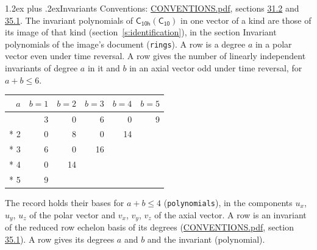 \documentclass[10pt,a4paper]{article}
\makeatletter
\renewcommand\section{\@startsection{section}{1}{\z@}{-3ex plus -1ex minus -.2ex}%
  {1.2ex plus .2ex}{\normalfont\large\sffamily\bfseries\color{parttitle}}}
\numberwithin{equation}{section}
\newcommand{\grp}[1]{\mathsf{#1}}
\makeatother
\begin{document}
\section{Invariants}\label{s:invariants}
Conventions: \href{../../CONVENTIONS.pdf}{CONVENTIONS.pdf}, sections \href{../../CONVENTIONS.pdf\#conv.31.2}{31.2} and \href{../../CONVENTIONS.pdf\#conv.35.1}{35.1}.
The invariant polynomials of $\grp{C_{10h}}(\grp{C_{10}})$ in one vector of a kind are those of its image of that kind (section~\ref{s:identification}), in the section Invariant polynomials of the image's document (\texttt{rings}).
\leavevmode\label{n:index.degree.polar}\label{n:index.degree.axial}A row is a degree $a$ in a polar vector even under time reversal. A row gives the number of linearly independent invariants of degree $a$ in it and $b$ in an axial vector odd under time reversal, for $a + b \le 6$.
{\small\begin{longtable}{@{}rrrrrr@{}}\toprule
$a$ & $b = 1$ & $b = 2$ & $b = 3$ & $b = 4$ & $b = 5$\\\midrule\endhead
\bottomrule\endfoot\endlastfoot
1 & 3 & 0 & 6 & 0 & 9\\*
2 & 0 & 8 & 0 & 14 & \\*
3 & 6 & 0 & 16 &  & \\*
4 & 0 & 14 &  &  & \\*
5 & 9 &  &  &  & \\
\bottomrule\end{longtable}}
\leavevmode\label{n:local.component.polar}\label{n:local.component.axial}The record holds their bases for $a + b \le 4$ (\texttt{polynomials}), in the components $u_{x}$, $u_{y}$, $u_{z}$ of the polar vector and $v_{x}$, $v_{y}$, $v_{z}$ of the axial vector. \label{n:head.polynomial}A row is an invariant of the reduced row echelon basis of its degrees (\href{../../CONVENTIONS.pdf}{CONVENTIONS.pdf}, section \href{../../CONVENTIONS.pdf\#conv.35.1}{35.1}). A row gives its degrees $a$ and $b$ and the invariant (polynomial).
\end{document}
